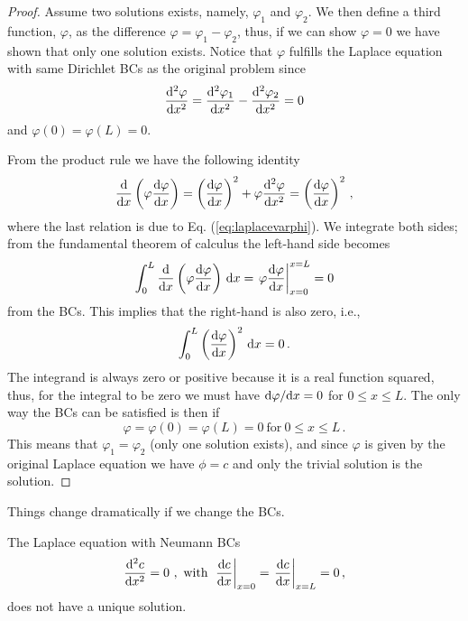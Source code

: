 \begin{proof}
	Assume two solutions exists, namely, $\varphi_1$ and $\varphi_2$. We then 
	define a third function, $\varphi$, 
	as the difference $\varphi = \varphi_1 - \varphi_2$, thus, if we can show $\varphi = 0$ we have shown 
	that only one solution exists. Notice that $\varphi$ fulfills the Laplace equation with same 
	Dirichlet BCs as the original problem since
	\begin{equation}
		\label{eq:laplacevarphi}
		 \frac{\mathrm{d}^2 \varphi}{\mathrm{d} x^2} =  \frac{\mathrm{d}^2 \varphi_1}{\mathrm{d} x^2} -  \frac{\mathrm{d}^2 \varphi_2}{\mathrm{d} x^2} = 0   
	\end{equation}
	and $\varphi(0) = \varphi(L)=0$. 

	From the product rule we have the following identity
	\begin{equation}
    	\frac{\mathrm{d}}{\mathrm{d} x}\left(\varphi \frac{\mathrm{d} \varphi}{\mathrm{d} x} \right) = \left( \frac{\mathrm{d} \varphi}{\mathrm{d}
        	x}\right)^2 + \varphi \frac{\mathrm{d}^2 \varphi}{\mathrm{d} x^2} = \left( \frac{\mathrm{d} \varphi}{\mathrm{d} x}\right)^2 \, ,
  \end{equation}
  where the last relation is due to Eq. (\ref{eq:laplacevarphi}). We integrate
	both sides; from the fundamental theorem of calculus the left-hand side
	becomes 
  \begin{equation}
    \int_0^L \frac{\mathrm{d}}{\mathrm{d} x}\left(\varphi \frac{\mathrm{d} \varphi}{\mathrm{d} x} \right) \, \mathrm{d} x  =
    \left.  \varphi \frac{\mathrm{d}  \varphi}{\mathrm{d} x} \right|_{x=0}^{x=L} = 0 
  \end{equation}
  from the BCs. This implies that the right-hand is also zero, i.e.,
  \begin{equation}
	  \int_0^L \left( \frac{\mathrm{d}  \varphi} {\mathrm{d} x}\right)^2 \, \mathrm{d} x = 0  \, .
  \end{equation}
  The integrand is always zero or positive because it is a real function squared, 
	thus, for the integral to be zero we
  must have $\mathrm{d}  \varphi /\mathrm{d} x = 0$ for $0 \leq x \leq L$. The only way the BCs can be
  satisfied is then if
  \begin{equation}
     \varphi  = \varphi(0)= \varphi(L)=0 \ \text{for}  \ 0 \leq x \leq L \, . 
  \end{equation}
	This means that $\varphi_1=\varphi_2$ (only one solution exists), 
	and since $\varphi$ is given by the original Laplace equation we have $\phi=c$ and only the 
	trivial solution is the solution.
\end{proof}

\noindent Things change dramatically if we change the BCs. 
\begin{theorem}
  The Laplace equation with Neumann BCs
  \begin{equation}
    \frac{\mathrm{d}^2c}{\mathrm{d} x^2} = 0 \ , \ \text{with} \  
    \left.\frac{\mathrm{d} c}{\mathrm{d} x}\right|_{x=0}=\left.\frac{\mathrm{d} c}{\mathrm{d} x}\right|_{x=L} =0 \, ,   
  \end{equation}
  does not have a unique solution.
\end{theorem}

